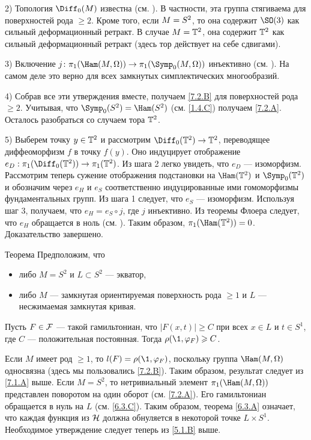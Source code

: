 2) Топология $\Diff_0 (M)$ известна (см. \cite{EE}).
В частности, эта группа стягиваема для поверхностей рода $\ge 2$.
Кроме того, если $M \z= S^2$, то она содержит $\SO (3)$ как сильный деформационный ретракт.
В случае $M = \mathbb{T}^2$, она содержит $\mathbb{T}^2$ как сильный деформационный ретракт (здесь тор действует на себе сдвигами).

3) Включение $j\: \pi_1 (\Ham (M, \Omega)) \to \pi_1 (\Symp_0 (M, \Omega))$ инъективно (см. \cite[10.18 iii]{MS}).
На самом деле это верно для всех замкнутых симплектических многообразий.

4) Собрав все эти утверждения вместе, получаем \ref{7.2.B} для поверхностей рода $\ge 2$.
Учитывая, что $\Symp_0 (S^2) = \Ham (S^2)$ (см. \ref{1.4.C}) получаем \ref{7.2.A}.
Осталось разобраться со случаем тора $\mathbb{T}^2$.

5) Выберем точку $y \in \mathbb{T}^2$ и рассмотрим  $\Diff_0 (\TT^2) \to \TT^2$, переводящее диффеоморфизм $f$ в точку $f(y)$.
Оно индуцирует отображение $e_D: \pi_1 (\Diff_0 (\TT^2)) \to \pi_1 (\TT^2)$.
Из шага 2 легко увидеть, что $e_D$ --- изоморфизм.
Рассмотрим теперь сужение отображения подстановки на $\Ham (\TT^2)$ и $\Symp_0 (\TT^2)$ и обозначим через $e_H$ и $e_S$ соответственно индуцированные ими гомоморфизмы фундаментальных групп.
Из шага 1 следует, что $e_S$ --- изоморфизм.
Используя шаг 3, получаем, что $e_H = e_S \circ j$, где $j$ инъективно.
Из теоремы Флоера следует, что $e_H$ обращается в ноль (см. \cite{LMP1}).
Таким образом, $\pi_1 (\Ham (\TT^2)) = 0$.
Доказательство завершено. 
\qeds

\begin{thm}[(\cite{P5})]{Теорема}\label{7.2.C}
Предположим, что 
\begin{itemize}
\item либо $M = S^2$ и $L \subset S^2$ --- экватор, 
\item либо $M$ --- замкнутая ориентируемая поверхность рода $\ge 1$ и $L$ --- несжимаемая замкнутая кривая.
\end{itemize}
Пусть $F \in \mathcal{F}$ --- такой гамильтониан, что $|F(x,t)| \ge C$ при всех $x \in L$ и $t \in S^1$, где $C$ --- положительная постоянная.
Тогда $\rho (\1, \phi_F) \z\ge C$.
\end{thm}

Если $M$ имеет род $\ge 1$, то $l (F) = \rho (\1, \phi_F)$, поскольку группа $\Ham (M, \Omega)$ односвязна (здесь мы пользовались \ref{7.2.B}).
Таким образом, результат следует из \ref{7.1.A} выше.
Если $M = S^2$, то нетривиальный элемент $\pi_1 (\Ham (M, \Omega))$ представлен поворотом на один оборот (см. \ref{7.2.A}).
Его гамильтониан обращается в нуль на $L$ (см. \ref{6.3.C}).
Таким образом, теорема \ref{6.3.A} означает, что каждая функция из $\mathcal{H}$ должна обнуляется в некоторой точке $L \times S^1$.
Необходимое утверждение следует теперь из \ref{5.1.B} выше.
\qeds

